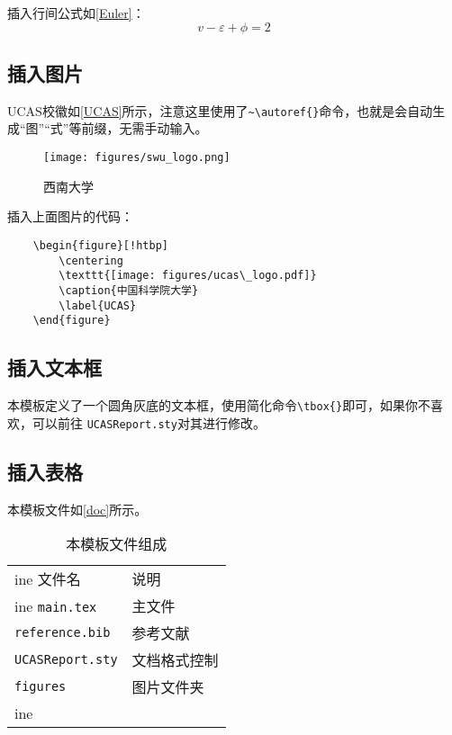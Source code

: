 \documentclass[zihao=-4,hyperref,a4paper,UTF8,autoindent=2em]{ctexart}
\begin{document}
插入行间公式如\autoref{Euler}：
\begin{equation}
    v-\varepsilon+\phi=2
    \label{Euler}
\end{equation}

\subsection{插入图片}
UCAS校徽如\autoref{UCAS}所示，注意这里使用了\verb|~\autoref{}|命令，也就是会自动生成“图”“式”等前缀，无需手动输入。

\begin{figure}[!htbp]
    \centering
    \texttt{[image: figures/swu\_logo.png]}
    \caption{西南大学}
    \label{UCAS}
\end{figure}

插入上面图片的代码：

\begin{verbatim}
    \begin{figure}[!htbp]
        \centering
        \texttt{[image: figures/ucas\_logo.pdf]}
        \caption{中国科学院大学}
        \label{UCAS}
    \end{figure}
\end{verbatim}

\subsection{插入文本框}
本模板定义了一个圆角灰底的文本框，使用简化命令\verb|\tbox{}|即可，如果你不喜欢，可以前往 \texttt{UCASReport.sty}对其进行修改。


\subsection{插入表格}
本模板文件如\autoref{doc}所示。
\begin{table}[!htbp]
    \centering
    \begin{tabular}{l  | l}
     ine
        文件名 & 说明 \\
         ine
        \texttt{main.tex}  & 主文件 \\
        \texttt{reference.bib} & 参考文献 \\
        \texttt{UCASReport.sty}  & 文档格式控制\\
        \texttt{figures}  & 图片文件夹 \\
         ine
    \end{tabular}
    \caption{本模板文件组成}
    \label{doc}
\end{table}
\end{document}

